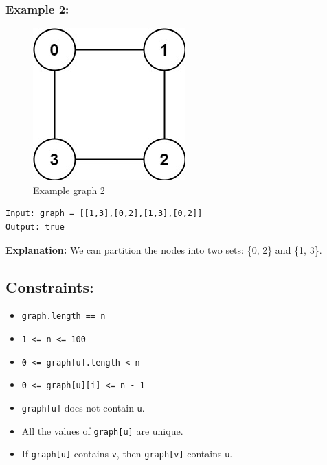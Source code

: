 \documentclass[11pt]{article}
\begin{document}
\subsubsection{Example 2:}
\label{sec:org6e51b85}
\begin{figure}[htbp]
\centering
\includegraphics[width=.9\linewidth]{./img/bi1.jpg}
\caption{Example graph 2}
\end{figure}

\begin{verbatim}
Input: graph = [[1,3],[0,2],[1,3],[0,2]]
Output: true
\end{verbatim}
\textbf{Explanation:} We can partition the nodes into two sets: \{0, 2\} and \{1, 3\}.

\subsection{Constraints:}
\label{sec:org6e85f07}
\begin{itemize}
\item \texttt{graph.length == n}
\item \texttt{1 <= n <= 100}
\item \texttt{0 <= graph[u].length < n}
\item \texttt{0 <= graph[u][i] <= n - 1}
\item \texttt{graph[u]} does not contain \texttt{u}.
\item All the values of \texttt{graph[u]} are unique.
\item If \texttt{graph[u]} contains \texttt{v}, then \texttt{graph[v]} contains \texttt{u}.
\end{itemize}
\end{document}
